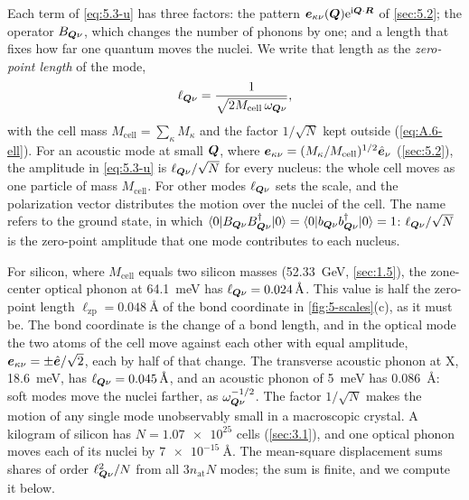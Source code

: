 Each term of \cref{eq:5.3-u} has three factors: the pattern $\bm{e}_{\kappa\nu}(\bm{Q})\mathrm{e}^{\mathrm{i}\bm{Q}\cdot\bm{R}}$ of \cref{sec:5.2}; the operator $B_{\bm{Q}\nu}$, which changes the number of phonons by one; and a length that fixes how far one quantum moves the nuclei. We write that length as the \emph{zero-point length} of the mode,
\begin{equation}
  \ell_{\bm{Q}\nu} = \frac{1}{\sqrt{2M_{\mathrm{cell}}\,\omega_{\bm{Q}\nu}}} ,
  \label{eq:5.3-ell}
\end{equation}
with the cell mass $M_{\mathrm{cell}} = \sum_\kappa M_\kappa$ and the factor $1/\sqrt N$ kept outside (\cref{eq:A.6-ell}). For an acoustic mode at small $\bm{Q}$, where $\bm{e}_{\kappa\nu} = (M_\kappa/M_{\mathrm{cell}})^{1/2}\hat{\bm{e}}_\nu$ (\cref{sec:5.2}), the amplitude in \cref{eq:5.3-u} is $\ell_{\bm{Q}\nu}/\sqrt N$ for every nucleus: the whole cell moves as one particle of mass $M_{\mathrm{cell}}$. For other modes $\ell_{\bm{Q}\nu}$ sets the scale, and the polarization vector distributes the motion over the nuclei of the cell. The name refers to the ground state, in which $\langle0|B_{\bm{Q}\nu}B^\dagger_{\bm{Q}\nu}|0\rangle = \langle0|b_{\bm{Q}\nu}b^\dagger_{\bm{Q}\nu}|0\rangle = 1$: $\ell_{\bm{Q}\nu}/\sqrt N$ is the zero-point amplitude that one mode contributes to each nucleus.

For silicon, where $M_{\mathrm{cell}}$ equals two silicon masses (\SI{52.33}{GeV}, \cref{sec:1.5}), the zone-center optical phonon at \SI{64.1}{meV} has $\ell_{\bm{Q}\nu} = \SI{0.024}{\angstrom}$. This value is half the zero-point length $\ell_{\mathrm{zp}} = \SI{0.048}{\angstrom}$ of the bond coordinate in \cref{fig:5-scales}(c), as it must be. The bond coordinate is the change of a bond length, and in the optical mode the two atoms of the cell move against each other with equal amplitude, $\bm{e}_{\kappa\nu} = \pm\hat{\bm{e}}/\sqrt2$, each by half of that change. The transverse acoustic phonon at X, \SI{18.6}{meV}, has $\ell_{\bm{Q}\nu} = \SI{0.045}{\angstrom}$, and an acoustic phonon of \SI{5}{meV} has \SI{0.086}{\angstrom}: soft modes move the nuclei farther, as $\omega_{\bm{Q}\nu}^{-1/2}$. The factor $1/\sqrt N$ makes the motion of any single mode unobservably small in a macroscopic crystal. A kilogram of silicon has $N = \num{1.07e25}$ cells (\cref{sec:3.1}), and one optical phonon moves each of its nuclei by $\SI{7e-15}{\angstrom}$. The mean-square displacement sums shares of order $\ell^2_{\bm{Q}\nu}/N$ from all $3n_{\mathrm{at}}N$ modes; the sum is finite, and we compute it below.

